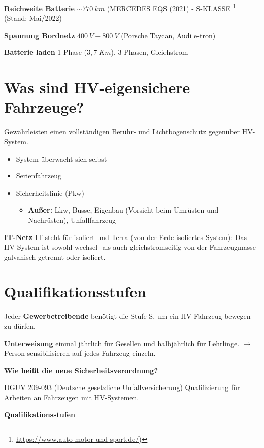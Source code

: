 \textbf{Reichweite Batterie} $\sim 770~km$ (MERCEDES EQS (2021) -
S-KLASSE \footnote{\url{https://www.auto-motor-und-sport.de/})} (Stand:
Mai/2022)

\textbf{Spannung Bordnetz} $400~V - 800~V$ (Porsche Taycan, Audi
e-tron)

\textbf{Batterie laden} 1-Phase ($3,7~Km$), 3-Phasen, Gleichstrom

\section{Was sind HV-eigensichere
Fahrzeuge?}\label{was-sind-hv-eigensichere-fahrzeuge}

Gewährleisten einen vollständigen Berühr- und Lichtbogenschutz gegenüber
HV-System.

\begin{itemize}
\item
  System überwacht sich selbst
\item
  Serienfahrzeug
\item
  Sicherheitslinie (Pkw)

  \begin{itemize}
  \item
    \textbf{Außer:} Lkw, Busse, Eigenbau (Vorsicht beim Umrüsten und
    Nachrüsten), Unfallfahrzeug
  \end{itemize}
\end{itemize}

\textbf{IT-Netz} IT steht für isoliert und Terra (von der Erde
isoliertes System): Das HV-System ist sowohl wechsel- als auch
gleichstromseitig von der Fahrzeugmasse galvanisch getrennt oder
isoliert.

\section{Qualifikationsstufen}\label{qualifikationsstufen}

Jeder \textbf{Gewerbetreibende} benötigt die Stufe-S, um ein HV-Fahrzeug
bewegen zu dürfen.

\textbf{Unterweisung} einmal jährlich für Gesellen und halbjährlich für
Lehrlinge. $\to$ Person sensibilisieren auf jedes Fahrzeug einzeln.

\textbf{Wie heißt die neue Sicherheitsverordnung?}

DGUV 209-093 (Deutsche gesetzliche Unfallversicherung) Qualifizierung
für Arbeiten an Fahrzeugen mit HV-Systemen.

\textbf{Qualifikationsstufen}

